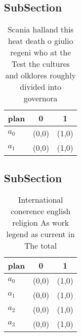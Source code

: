 \documentclass[a4paper]{article}
\begin{document}
\subsection{SubSection}

\begin{table}
\begin{adjustbox}{width=1\columnwidth}
\begin{tabular}{|l|l|l|}
\hline
\textbf{plan} & \multicolumn{1}{c|}{\textbf{0}} & \multicolumn{1}{c|}{\textbf{1}} \\ \hline
\textbf{$a_0$}  & (0,0) & (1,0) \\ \hline
\textbf{$a_1$}  & (0,0) & (1,0) \\ \hline
\end{tabular}
\end{adjustbox}
\caption{Scania halland this heat death o giulio regeni who at the Test the cultures and olklores roughly divided into governora
}
\end{table}

\subsection{SubSection}

\begin{table}
\begin{adjustbox}{width=0.7\columnwidth}
\begin{tabular}{|l|l|l|}
\hline
\textbf{plan} & \multicolumn{1}{c|}{\textbf{0}} & \multicolumn{1}{c|}{\textbf{1}} \\ \hline
\textbf{$a_0$}  & (0,0) & (1,0) \\ \hline
\textbf{$a_1$}  & (0,0) & (1,0) \\ \hline
\textbf{$a_2$}  & (0,0) & (1,0) \\ \hline
\textbf{$a_3$}  & (0,0) & (1,0) \\ \hline
\end{tabular}
\end{adjustbox}
\caption{International conerence english religion As work legend as current in The total
}
\end{table}
\end{document}
